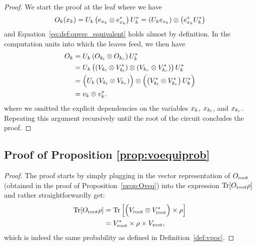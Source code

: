 \begin{proof}
	We start the proof at the leaf where we have
	\begin{align}
		O_k(x_k)
		=
		U_k \left( e_{x_k} \otimes e_{x_k}^*  \right) U_k^*
		=
		\left( U_k e_{x_k} \right) \otimes \left( e_{x_k}^* U_k^* \right)
	\end{align}
	and Equation~\ref{eq:def:opvec_equivalent} holds almost by definition. In the computation units into which the leaves feed, we then have
	\begin{align}
		O_k
		 & = U_k \left( O_{k_l} \otimes O_{k_r} \right) U_k^*
		\nonumber
		\\
		 & = U_k \left( (V_{k_l} \otimes V^*_{k_l}) \otimes (V_{k_r} \otimes V^*_{k_r} ) \right) U_k^*
		\nonumber
		\\
		 & = \Bigl( U_k \left( V_{k_l} \otimes V_{k_r} \right) \Bigr)
		\otimes
		\Bigl( \left( V^*_{k_l}  \otimes V^*_{k_r}  \right) U_k^* \Bigr)
		\nonumber
		\\
		 & = v_k \otimes v_k^*.
	\end{align}
	where we omitted the explicit dependencies on the variables $x_k$, $x_{k_l}$, and $x_{k_r}$.
	Repeating this argument recursively until the root of the circuit concludes the proof.
\end{proof}





\subsection{Proof of Proposition \ref{prop:voequiprob}}
\label{sec:proof:prop:voequiprob}

\propvoequiprob*





\begin{proof}
	The proof starts by simply plugging in the vector representation of $O_{\text{root}}$ (obtained in the proof of Proposition~\ref{prop:Oveq}) into the expression $\Tr [O_{\text{root}} \rho]$ and rather straightforwardly get:
	\begin{align}
		\Tr [O_{\text{root}} \rho]
		 &
		=
		\Tr \left[
			\Bigl(V_{\text{root}} \otimes V^*_{\text{root}}   \Bigr) \times \rho
			\right]
		\\
		 & = V^*_{\text{root}} \times  \rho \times V_{\text{root}},
	\end{align}
	which is indeed the same probability as defined in Definition~\ref{def:vpoc}.
\end{proof}


















